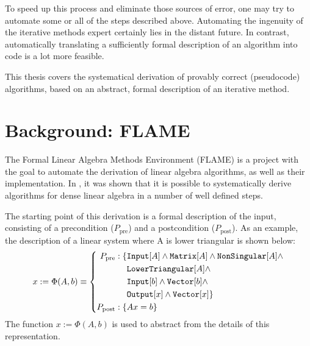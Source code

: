 To speed up this process and eliminate those sources of error, one may try to automate some or all of the steps described above. Automating the ingenuity of the iterative methods expert certainly lies in the distant future. In contrast, automatically translating a sufficiently formal description of an algorithm into code is a lot more feasible.

This thesis covers the systematical derivation of provably correct (pseudocode) algorithms, based on an abstract, formal description of an iterative method.


%
%
\section{Background: FLAME}

The Formal Linear Algebra Methods Environment (FLAME) \cite{Bientinesi2005:504, gunnels2001flame} is a project with the goal to automate the derivation of linear algebra algorithms, as well as their implementation.
In \cite{Bientinesi:thesis}, it was shown that it is possible to systematically derive algorithms for dense linear algebra in a number of well defined steps.

The starting point of this derivation is a formal description of the input, consisting of a precondition ($P_\text{pre}$) and a postcondition ($P_\text{post}$). As an example, the description of a linear system where A is lower triangular is shown below:
%
\begin{align*}
x:= \Phi ( A, b) \equiv
\left\{
\begin{aligned}
P_\text{pre}: \{ &\text{\ttfamily Input}[A] \land \text{\ttfamily Matrix}[A] \land \text{\ttfamily NonSingular}[A] \land \\
		&\text{\ttfamily LowerTriangular}[A] \land \\
		&\text{\ttfamily Input}[b] \land \text{\ttfamily Vector}[b] \land \\
		&\text{\ttfamily Output}[x] \land \text{\ttfamily Vector}[x] \} \\
P_\text{post}: \{ & Ax = b \}
\end{aligned}
\right. %
\end{align*}
%
The function $x:= \Phi (A, b)$ is used to abstract from the details of this representation.

